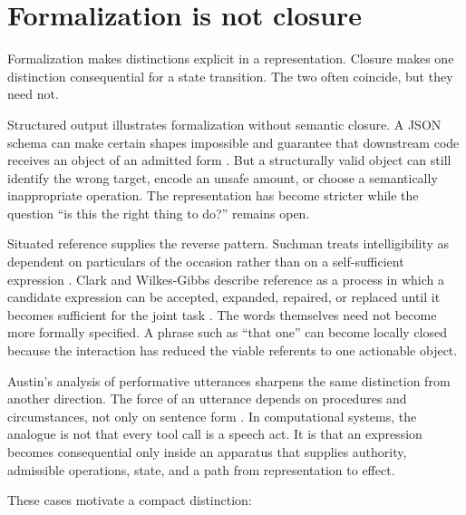 \documentclass[11pt]{article}
\begin{document}
\section{Formalization is not closure}
Formalization makes distinctions explicit in a representation. Closure makes one distinction consequential for a state transition. The two often coincide, but they need not.

Structured output illustrates formalization without semantic closure. A JSON schema can make certain shapes impossible and guarantee that downstream code receives an object of an admitted form \parencite{openai2026structured}. But a structurally valid object can still identify the wrong target, encode an unsafe amount, or choose a semantically inappropriate operation. The representation has become stricter while the question ``is this the right thing to do?'' remains open.

Situated reference supplies the reverse pattern. Suchman treats intelligibility as dependent on particulars of the occasion rather than on a self-sufficient expression \parencite{suchman1985plans}. Clark and Wilkes-Gibbs describe reference as a process in which a candidate expression can be accepted, expanded, repaired, or replaced until it becomes sufficient for the joint task \parencite{clarkwilkesgibbs1986}. The words themselves need not become more formally specified. A phrase such as ``that one'' can become locally closed because the interaction has reduced the viable referents to one actionable object.

Austin's analysis of performative utterances sharpens the same distinction from another direction. The force of an utterance depends on procedures and circumstances, not only on sentence form \parencite{austin1962how}. In computational systems, the analogue is not that every tool call is a speech act. It is that an expression becomes consequential only inside an apparatus that supplies authority, admissible operations, state, and a path from representation to effect.

These cases motivate a compact distinction:
\end{document}
